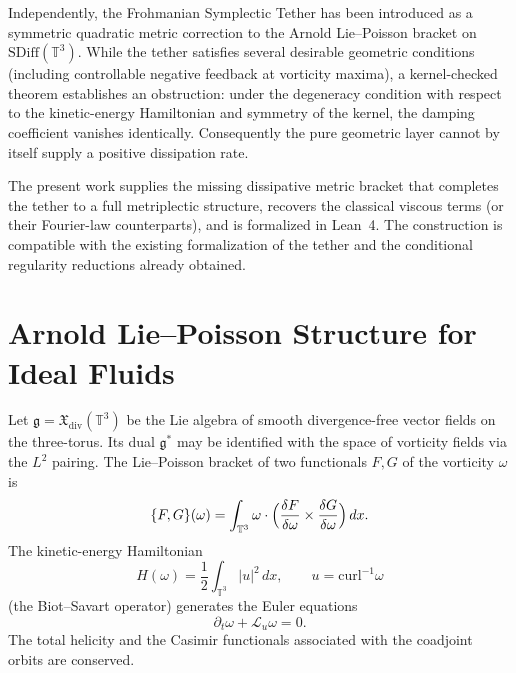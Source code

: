 \documentclass[11pt,a4paper]{article}
\begin{document}
Independently, the Frohmanian Symplectic Tether has been introduced as a symmetric quadratic metric correction to the Arnold Lie--Poisson bracket on \(\mathrm{SDiff}(\mathbb{T}^3)\). While the tether satisfies several desirable geometric conditions (including controllable negative feedback at vorticity maxima), a kernel-checked theorem establishes an obstruction: under the degeneracy condition with respect to the kinetic-energy Hamiltonian and symmetry of the kernel, the damping coefficient vanishes identically. Consequently the pure geometric layer cannot by itself supply a positive dissipation rate.

The present work supplies the missing dissipative metric bracket that completes the tether to a full metriplectic structure, recovers the classical viscous terms (or their Fourier-law counterparts), and is formalized in Lean~4. The construction is compatible with the existing formalization of the tether and the conditional regularity reductions already obtained.

\section{Arnold Lie--Poisson Structure for Ideal Fluids}
Let \(\mathfrak{g} = \mathfrak{X}_{\mathrm{div}}(\mathbb{T}^3)\) be the Lie algebra of smooth divergence-free vector fields on the three-torus. Its dual \(\mathfrak{g}^*\) may be identified with the space of vorticity fields via the \(L^2\) pairing. The Lie--Poisson bracket of two functionals \(F,G\) of the vorticity \(\omega\) is
\begin{equation}
\{F,G\}(\omega) = \int_{\mathbb{T}^3} \omega \cdot \Bigl(
\frac{\delta F}{\delta\omega}\times\frac{\delta G}{\delta\omega}\Bigr)\,dx.
\end{equation}
The kinetic-energy Hamiltonian
\begin{equation}
H(\omega) = \frac12\int_{\mathbb{T}^3}|u|^2\,dx,\qquad
u = \mathrm{curl}^{-1}\omega
\end{equation}
(the Biot--Savart operator) generates the Euler equations
\begin{equation}
\partial_t\omega + \mathcal{L}_u\omega = 0.
\end{equation}
The total helicity and the Casimir functionals associated with the coadjoint orbits are conserved.
\end{document}
